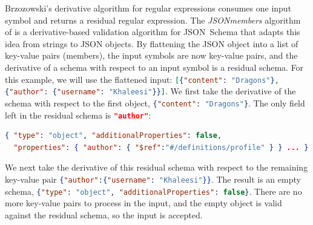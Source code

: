\documentclass[acmsmall,%
  screen,%
  authorversion, %
  nonacm%
]{acmart}
\newcommand{\JSONSchema}{%
  JSON~Schema\xspace%
}
\newcommand{\JSON}{\ac{JSON}\xspace}
\begin{document}
Brzozowski's derivative algorithm for regular expressions consumes one input symbol and returns a residual regular expression.
The \emph{JSONmembers} algorithm of \citet{holstege2019application} is a derivative-based validation algorithm for \JSONSchema that adapts this idea from strings to \JSON objects.
By flattening the \JSON object into a list of key-value pairs (members),
the input symbols are now key-value pairs, and the derivative of a schema with respect to an input symbol is a residual schema.
For this example, we will use the flattened input: \lstinline[language=json]|[{"content": "Dragons"}, {"author": {"username": "Khaleesi"}}]|.
We first take the derivative of the schema with respect to the first object, \lstinline[language=json]|{"content": "Dragons"}|. 
The only field left in the residual schema is \lstinline[language=json]|"author"|:
\begin{lstlisting}[language=json]
{ "type": "object", "additionalProperties": false, 
  "properties": { "author": { "$ref":"#/definitions/profile" } } ... }
\end{lstlisting}
We next take the derivative of this residual schema with respect to the remaining key-value pair \lstinline[language=json]|{"author":{"username": "Khaleesi"}}|. 
The result is an empty schema, \lstinline[language=json]
|{"type": "object", "additionalProperties": false}|.
There are no more key-value pairs to process in the input, and the empty object is valid against the residual schema, so the input is accepted.
\end{document}
